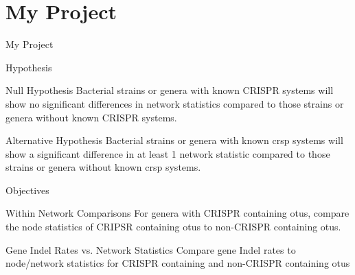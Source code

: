 \documentclass[dvipsnames]{beamer}
\begin{document}
\section{My Project}
\begin{frame}{}
    \begin{center}
        \Huge \textcolor{OliveGreen}{My Project}
    \end{center}
    \addtocounter{framenumber}{-1}
\end{frame}
\begin{frame}[fragile]{Hypothesis}
     \begin{block}{Null Hypothesis}
     Bacterial strains or genera with known CRISPR systems will show no significant differences in network statistics compared to those strains or genera without known CRISPR systems.
    \end{block}
     \begin{block}{Alternative Hypothesis}
     Bacterial strains or genera with known \ac{crsp} systems will show a significant difference in at least 1 network statistic compared to those strains or  genera without known \ac{crsp} systems.
    \end{block}
\end{frame}
\begin{frame}[fragile]{Objectives}
     \begin{block}{Within Network Comparisons}
        For genera with CRISPR containing \ac{otu}s, compare the node statistics of CRIPSR containing \ac{otu}s to non-CRISPR containing \ac{otu}s.
    \end{block}
     \begin{block}{Gene Indel Rates vs. Network Statistics}
        Compare gene Indel rates to node/network statistics for CRISPR containing and non-CRISPR containing \ac{otu}s
    \end{block}
\end{frame}
\end{document}
